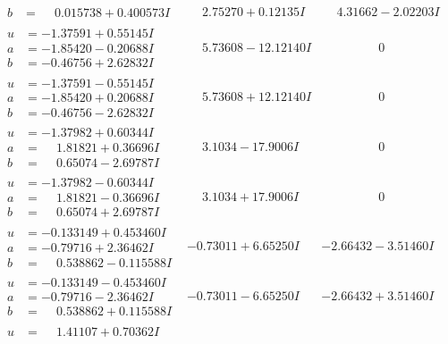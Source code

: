 \documentclass[1p]{elsarticle_modified}
\theoremstyle{definition}
\begin{document}
$$\begin{array}{c|c|c}
\begin{aligned}
b &= \phantom{-}0.015738 + 0.400573 I\end{aligned}
 & \phantom{-}2.75270 + 0.12135 I & \phantom{-}4.31662 - 2.02203 I \\ \hline\begin{aligned}
u &= -1.37591 + 0.55145 I \\
a &= -1.85420 - 0.20688 I \\
b &= -0.46756 + 2.62832 I\end{aligned}
 & \phantom{-}5.73608 - 12.12140 I & \phantom{-0.000000 } 0 \\ \hline\begin{aligned}
u &= -1.37591 - 0.55145 I \\
a &= -1.85420 + 0.20688 I \\
b &= -0.46756 - 2.62832 I\end{aligned}
 & \phantom{-}5.73608 + 12.12140 I & \phantom{-0.000000 } 0 \\ \hline\begin{aligned}
u &= -1.37982 + 0.60344 I \\
a &= \phantom{-}1.81821 + 0.36696 I \\
b &= \phantom{-}0.65074 - 2.69787 I\end{aligned}
 & \phantom{-}3.1034 - 17.9006 I & \phantom{-0.000000 } 0 \\ \hline\begin{aligned}
u &= -1.37982 - 0.60344 I \\
a &= \phantom{-}1.81821 - 0.36696 I \\
b &= \phantom{-}0.65074 + 2.69787 I\end{aligned}
 & \phantom{-}3.1034 + 17.9006 I & \phantom{-0.000000 } 0 \\ \hline\begin{aligned}
u &= -0.133149 + 0.453460 I \\
a &= -0.79716 + 2.36462 I \\
b &= \phantom{-}0.538862 - 0.115588 I\end{aligned}
 & -0.73011 + 6.65250 I & -2.66432 - 3.51460 I \\ \hline\begin{aligned}
u &= -0.133149 - 0.453460 I \\
a &= -0.79716 - 2.36462 I \\
b &= \phantom{-}0.538862 + 0.115588 I\end{aligned}
 & -0.73011 - 6.65250 I & -2.66432 + 3.51460 I \\ \hline\begin{aligned}
u &= \phantom{-}1.41107 + 0.70362 I \\

\end{aligned}
\end{array}$$
\end{document}
